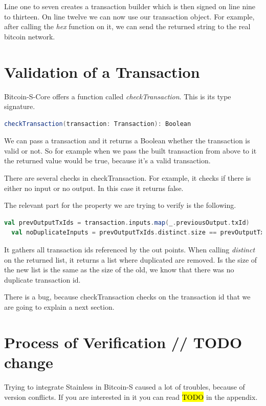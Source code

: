 Line one to seven creates a transaction builder which is then signed on line nine to thirteen.
On line twelve we can now use our transaction object.
For example, after calling the \emph{hex} function on it, we can send the returned string to the real bitcoin network.


\section{Validation of a Transaction}

Bitcoin-S-Core offers a function called \emph{checkTransaction}.
This is its type signature.
\begin{lstlisting}[language=scala]
  checkTransaction(transaction: Transaction): Boolean
\end{lstlisting}
We can pass a transaction and it returns a Boolean whether the transaction is valid or not.
So for example when we pass the built transaction from above to it the returned value would be true, because it's a valid transaction.

There are several checks in checkTransaction.
For example, it checks if there is either no input or no output.
In this case it returns false.

The relevant part for the property we are trying to verify is the following.
\begin{lstlisting}[language=scala]
  val prevOutputTxIds = transaction.inputs.map(_.previousOutput.txId)
  val noDuplicateInputs = prevOutputTxIds.distinct.size == prevOutputTxIds.size
\end{lstlisting}

It gathers all transaction ids referenced by the out points.
When calling \emph{distinct} on the returned list, it returns a list where duplicated are removed.
Is the size of the new list is the same as the size of the old, we know that there was no duplicate transaction id.

There is a bug, because checkTransaction checks on the transaction id that we are going to explain a next section.


\section{Process of Verification // TODO change}

Trying to integrate Stainless in Bitcoin-S caused a lot of troubles, because of version conflicts.
If you are interested in it you can read \hl{TODO} in the appendix.

